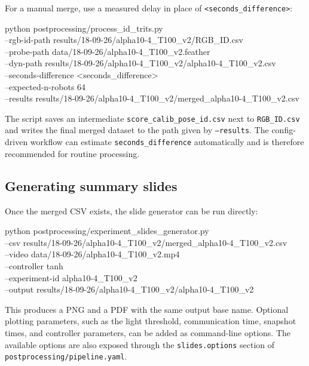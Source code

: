 \documentclass[11pt,a4paper]{article}
\begin{document}
For a manual merge, use a measured delay in place of \texttt{<seconds\_difference>}:

\begin{codeblock}
python postprocessing/process_id_trits.py \\
  --rgb-id-path results/18-09-26/alpha10-4_T100_v2/RGB_ID.csv \\
  --probe-path data/18-09-26/alpha10-4_T100_v2.feather \\
  --dyn-path results/18-09-26/alpha10-4_T100_v2/alpha10-4_T100_v2.csv \\
  --seconds-difference <seconds_difference> \\
  --expected-n-robots 64 \\
  --results results/18-09-26/alpha10-4_T100_v2/merged_alpha10-4_T100_v2.csv
\end{codeblock}

The script saves an intermediate \texttt{score\_calib\_pose\_id.csv} next to \texttt{RGB\_ID.csv} and writes the final merged dataset to the path given by \texttt{--results}. The config-driven workflow can estimate \texttt{seconds\_difference} automatically and is therefore recommended for routine processing.

\subsection{Generating summary slides}

Once the merged CSV exists, the slide generator can be run directly:

\begin{codeblock}
python postprocessing/experiment_slides_generator.py \\
  --csv results/18-09-26/alpha10-4_T100_v2/merged_alpha10-4_T100_v2.csv \\
  --video data/18-09-26/alpha10-4_T100_v2.mp4 \\
  --controller tanh \\
  --experiment-id alpha10-4_T100_v2 \\
  --output results/18-09-26/alpha10-4_T100_v2/alpha10-4_T100_v2
\end{codeblock}

This produces a PNG and a PDF with the same output base name. Optional plotting parameters, such as the light threshold, communication time, snapshot times, and controller parameters, can be added as command-line options. The available options are also exposed through the \texttt{slides.options} section of \texttt{postprocessing/pipeline.yaml}.
\end{document}
